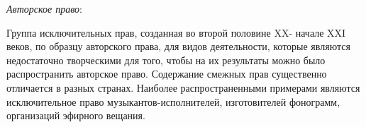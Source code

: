 \textit{Авторское право}:

Группа исключительных прав, созданная во второй половине XX- начале XXI веков, по образцу авторского права, для видов деятельности, которые являются недостаточно творческими для того, чтобы на их результаты можно было распространить авторское право. Содержание смежных прав существенно отличается в разных странах. Наиболее распространенными примерами являются исключительное право музыкантов-исполнителей, изготовителей фонограмм, организаций эфирного вещания.\\
